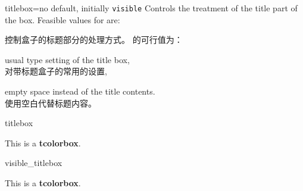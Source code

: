 \begin{docTcbKey}[][doc new=2019-03-01]{titlebox}{=}{no default, initially \texttt{visible}}
Controls the treatment of the title part of the box.
Feasible values for  are:

控制盒子的标题部分的处理方式。  的可行值为：

\begin{DescriptionL}{}
\item[\docValue{visible}]usual type setting of the title box,\\
对带标题盒子的常用的设置,
\item[\docValue{invisible}]empty space instead of the title contents.\\
使用空白代替标题内容。
\end{DescriptionL}


\begin{exdispExample}{titlebox}
\begin{tcolorbox}[title=My invisible title,
  titlebox=invisible]
This is a \textbf{tcolorbox}.
\end{tcolorbox}
\end{exdispExample}

\begin{exdispExample}{visible_titlebox}
  \begin{tcolorbox}[title=My visible title,
    titlebox=visible]
  This is a \textbf{tcolorbox}.
  \end{tcolorbox}
  \end{exdispExample}
\end{docTcbKey}



